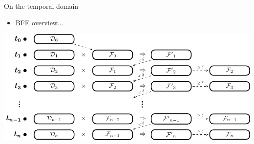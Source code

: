 \documentclass{beamer}
\begin{document}
    \begin{frame}{On the temporal domain}
        \begin{itemize} \item BFE overview... \end{itemize} \vspace{0.5cm}

        \centering
        \includegraphics[height=0.55\textheight]{figures/FF_stages}
    \end{frame}
\end{document}

